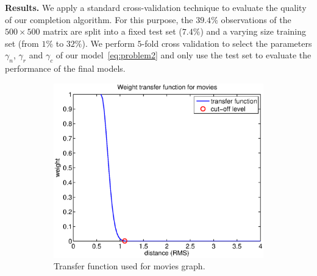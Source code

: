 \documentclass{article}
\begin{document}
{\bf Results. }
We apply a standard cross-validation technique to evaluate the quality of our completion algorithm. For this purpose, the $39.4\%$ observations of the $500\times 500$ matrix are split into a fixed test set ($7.4\%$) and a varying size training set (from $1\%$ to $32\%$). We perform $5$-fold cross validation to select the parameters $\gamma_n$, $\gamma_r$ and $\gamma_c$ of our model~\eqref{eq:problem2} and only use the test set to evaluate the performance of the final models.
\begin{figure}
        \begin{subfigure}[b]{.5\linewidth}
            \centering \includegraphics[scale=.38, trim=0 0 0 0, clip=true]{transfer_fun_movies.eps}
            \caption{Transfer function used for movies graph.}\label{fig:transfer_fun_movies}
          \end{subfigure}
          \begin{subfigure}[b]{.5\linewidth}

\end{subfigure}
\end{figure}
\end{document}
